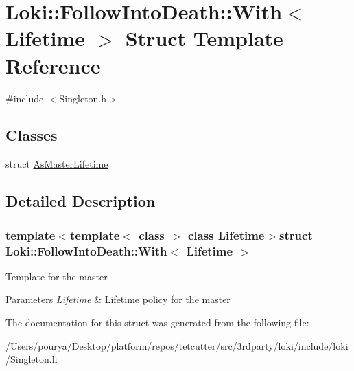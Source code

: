 \hypertarget{structLoki_1_1FollowIntoDeath_1_1With}{}\section{Loki\+:\+:Follow\+Into\+Death\+:\+:With$<$ Lifetime $>$ Struct Template Reference}
\label{structLoki_1_1FollowIntoDeath_1_1With}


{\ttfamily \#include $<$Singleton.\+h$>$}

\subsection*{Classes}
\begin{DoxyCompactItemize}
\item 
struct \hyperlink{structLoki_1_1FollowIntoDeath_1_1With_1_1AsMasterLifetime}{As\+Master\+Lifetime}
\end{DoxyCompactItemize}


\subsection{Detailed Description}
\subsubsection*{template$<$template$<$ class $>$ class Lifetime$>$struct Loki\+::\+Follow\+Into\+Death\+::\+With$<$ Lifetime $>$}

Template for the master 
\begin{DoxyParams}{Parameters}
{\em Lifetime} & Lifetime policy for the master \\
\hline
\end{DoxyParams}


The documentation for this struct was generated from the following file\+:\begin{DoxyCompactItemize}
\item 
/\+Users/pourya/\+Desktop/platform/repos/tetcutter/src/3rdparty/loki/include/loki/Singleton.\+h\end{DoxyCompactItemize}
